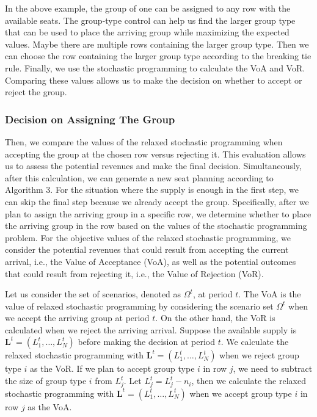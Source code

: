 In the above example, the group of one can be assigned to any row with the available seats. The group-type control can help us find the larger group type that can be used to place the arriving group while maximizing the expected values. Maybe there are multiple rows containing the larger group type. Then we can choose the row containing the larger group type according to the breaking tie rule. 
Finally, we use the stochastic programming to calculate the VoA and VoR. Comparing these values allows us to make the decision on whether to accept or reject the group.



\subsubsection*{Decision on Assigning The Group}
Then, we compare the values of the relaxed stochastic programming when accepting the group at the chosen row versus rejecting it. This evaluation allows us to assess the potential revenues and make the final decision. Simultaneously, after this calculation, we can generate a new seat planning according to Algorithm 3. For the situation where the supply is enough in the first step, we can skip the final step because we already accept the group. Specifically, after we plan to assign the arriving group in a specific row, we determine whether to place the arriving group in the row based on the values of the stochastic programming problem. For the objective values of the relaxed stochastic programming, we consider the potential revenues that could result from accepting the current arrival, i.e., the Value of Acceptance (VoA), as well as the potential outcomes that could result from rejecting it, i.e., the Value of Rejection (VoR). 

Let us consider the set of scenarios, denoted as $\Omega^{t}$, at period $t$. The VoA is the value of 
relaxed stochastic programming by considering the scenario set $\Omega^{t}$ when we accept the arriving group at period $t$. On the other hand, the VoR is calculated when we reject the arriving arrival. Suppose the available supply is $\mathbf{L}^{t} = (L_1^{t}, \ldots, L_N^{t})$ before making the decision at period $t$. We calculate the relaxed stochastic programming with $\mathbf{L}^{t}= (L_1^{t}, \ldots, L_N^{t})$ when we reject group type $i$ as the VoR. If we plan to accept group type $i$ in row $j$, we need to subtract the size of group type $i$ from $L_j^{t}$. Let $L_j^{t} = L_j^{t} - n_{i}$, then we calculate the relaxed stochastic programming with $\mathbf{L}^{t}= (L_1^{t}, \ldots, L_N^{t})$ when we accept group type $i$ in row $j$ as the VoA.

